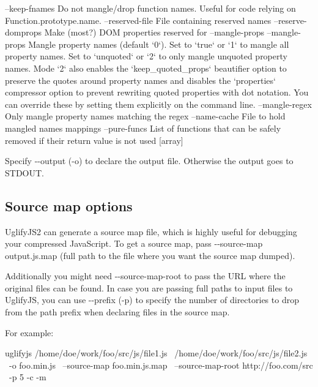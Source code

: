 \begin{DoxyCode}
--keep-fnames                 Do not mangle/drop function names.  Useful for
                              code relying on Function.prototype.name.
--reserved-file               File containing reserved names
--reserve-domprops            Make (most?) DOM properties reserved for
                              --mangle-props
--mangle-props                Mangle property names (default `0`). Set to 
                              `true` or `1` to mangle all property names. Set
                              to `unquoted` or `2` to only mangle unquoted 
                              property names. Mode `2` also enables the
                              `keep\_quoted\_props` beautifier option to 
                              preserve the quotes around property names and
                              disables the `properties` compressor option to
                              prevent rewriting quoted properties with dot
                              notation. You can override these by setting
                              them explicitly on the command line.
--mangle-regex                Only mangle property names matching the regex
--name-cache                  File to hold mangled names mappings
--pure-funcs                  List of functions that can be safely removed if
                              their return value is not used           [array]
\end{DoxyCode}


Specify {\ttfamily -\/-\/output} ({\ttfamily -\/o}) to declare the output file. Otherwise the output goes to S\+T\+D\+O\+UT.

\subsection*{Source map options}

Uglify\+J\+S2 can generate a source map file, which is highly useful for debugging your compressed Java\+Script. To get a source map, pass {\ttfamily -\/-\/source-\/map output.\+js.\+map} (full path to the file where you want the source map dumped).

Additionally you might need {\ttfamily -\/-\/source-\/map-\/root} to pass the U\+RL where the original files can be found. In case you are passing full paths to input files to Uglify\+JS, you can use {\ttfamily -\/-\/prefix} ({\ttfamily -\/p}) to specify the number of directories to drop from the path prefix when declaring files in the source map.

For example\+: \begin{DoxyVerb}uglifyjs /home/doe/work/foo/src/js/file1.js \
         /home/doe/work/foo/src/js/file2.js \
         -o foo.min.js \
         --source-map foo.min.js.map \
         --source-map-root http://foo.com/src \
         -p 5 -c -m
\end{DoxyVerb}


